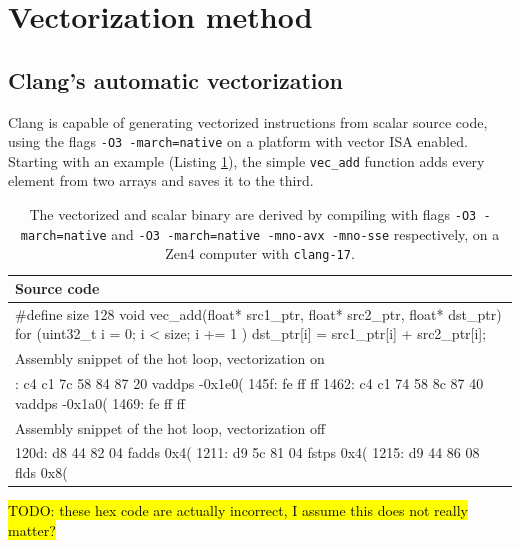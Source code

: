 \documentclass[logo,bsc,singlespacing,parskip]{infthesis}
\newenvironment{VerbatimCompact}
  {\vspace*{-2.5mm}\VerbatimEnvironment
   \par\Verbatim}
  {\endVerbatim\vspace*{-2.4mm}}
\begin{document}
\section{Vectorization method}
\label{sec:vectorization-method}
\subsection{Clang's automatic vectorization}
Clang is capable of generating vectorized instructions from scalar source code,
using the flags \texttt{-O3 -march=native} on a platform with vector ISA
enabled. Starting with an example (Listing \ref{vec-add-float-auto}), the simple
\texttt{vec\_add} function adds every element from two arrays and saves it to
the third. 

\begin{table}[ht]\captionsetup{name=Listing}
\captionsetup{justification=centering}
\begin{tabular}{>{\raggedright\arraybackslash}p{14cm}}
    Source code\\
    \midrule
    \begin{VerbatimCompact}
#define size 128
void vec_add(float* src1_ptr, float* src2_ptr, float* dst_ptr) {
    for (uint32_t i = 0; i < size; i += 1 ){
        dst_ptr[i] = src1_ptr[i] + src2_ptr[i];
    }
}
    \end{VerbatimCompact}
    \\

    Assembly snippet of the hot loop, vectorization on\\
    \midrule
    \begin{VerbatimCompact}
1458: c4 c1 7c 58 84 87 20   vaddps -0x1e0(%
145f: fe ff ff
1462: c4 c1 74 58 8c 87 40   vaddps -0x1a0(%
1469: fe ff ff
    \end{VerbatimCompact}
    \\
    Assembly snippet of the hot loop, vectorization off\\
    \midrule
    \begin{VerbatimCompact}
120d: d8 44 82 04    fadds  0x4(%
1211: d9 5c 81 04    fstps  0x4(%
1215: d9 44 86 08    flds   0x8(%
    \end{VerbatimCompact}
\end{tabular}
\caption{The vectorized and scalar binary are derived by compiling with flags
\texttt{-O3 -march=native} and \texttt{-O3 -march=native -mno-avx -mno-sse}
respectively, on a Zen4 computer with \texttt{clang-17}.}
\label{vec-add-float-auto}
\end{table}
\hl{TODO: these hex code are actually incorrect, I assume this does not really matter?}
\end{document}
